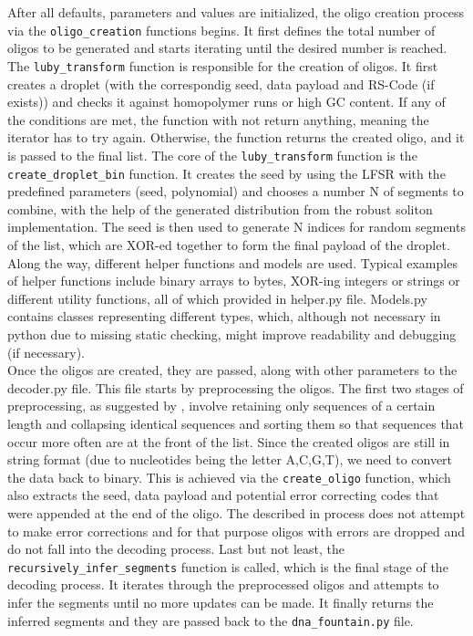 \documentclass[12pt]%
{article}
\begin{document}
After all defaults, parameters and values are initialized, the oligo creation process via the \texttt{oligo\_creation} functions begins. It first defines the total number of oligos to be generated and starts iterating until the desired number is reached. The \texttt{luby\_transform} function is responsible for the creation of oligos. It first creates a droplet (with the correspondig seed, data payload and RS-Code (if exists)) and checks it against homopolymer runs or high GC content. If any of the conditions are met, the function with not return anything, meaning the iterator has to try again. Otherwise, the function returns the created oligo, and it is passed to the final list. The core of the \texttt{luby\_transform} function is the \texttt{create\_droplet\_bin} function. It creates the seed by using the LFSR with the predefined parameters (seed, polynomial) and chooses a number N of segments to combine, with the help of the generated distribution from the robust soliton implementation.  The seed is then used to generate N indices for random segments of the list, which are XOR-ed together to form the final payload of the droplet. Along the way, different helper functions and models are used. Typical examples of helper functions include binary arrays to bytes, XOR-ing integers or strings or different utility functions, all of which provided in helper.py file. Models.py contains classes representing different types, which, although not necessary in python due to missing static checking, might improve readability and debugging (if necessary). \\
Once the oligos are created, they are passed, along with other parameters to the decoder.py file. This file starts by preprocessing the oligos. The first two stages of preprocessing, as suggested by \cite{erlich2017dnasupplementary}, involve retaining only sequences of a certain length and collapsing identical sequences and sorting them so that sequences that occur more often are at the front of the list. Since the created oligos are still in string format (due to nucleotides being the letter A,C,G,T), we need to convert the data back to binary. This is achieved via the \texttt{create\_oligo} function, which also extracts the seed, data payload and potential error correcting codes that were appended at the end of the oligo. The described in \cite{erlich2017dna} process does not attempt to make error corrections and for that purpose oligos with errors are dropped and do not fall into the decoding process. Last but not least, the \texttt{recursively\_infer\_segments} function is called, which is the final stage of the decoding process. It iterates through the preprocessed oligos and attempts to infer the segments until no more updates can be made. It finally returns the inferred segments and they are passed back to the \texttt{dna\_fountain.py} file. \\
\end{document}
